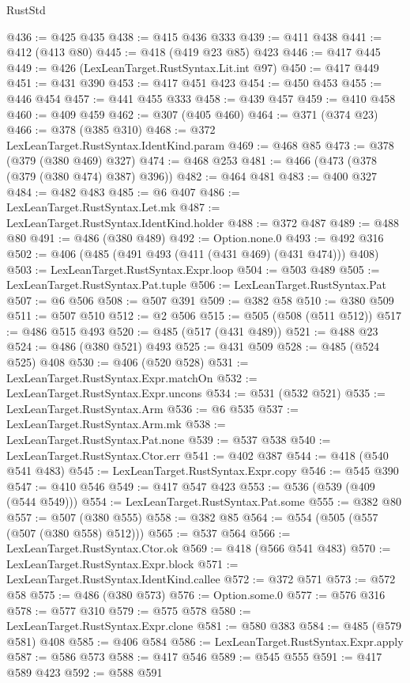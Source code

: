 \begin{lexlean}{RustStd}
\begin{coremodule}
{\begin{coremodule}
{{{{{{{{{{{@436 := @425 @435
@438 := @415 @436 @333
@439 := @411 @438
@441 := @412 (@413 @80)
@445 := @418 (@419 @23 @85) @423
@446 := @417 @445
@449 := @426 (LexLeanTarget.RustSyntax.Lit.int @97)
@450 := @417 @449
@451 := @431 @390
@453 := @417 @451 @423
@454 := @450 @453
@455 := @446 @454
@457 := @441 @455 @333
@458 := @439 @457
@459 := @410 @458
@460 := @409 @459
@462 := @307 (@405 @460)
@464 := @371 (@374 @23)
@466 := @378 (@385 @310)
@468 := @372 LexLeanTarget.RustSyntax.IdentKind.param
@469 := @468 @85
@473 := @378 (@379 (@380 @469) @327)
@474 := @468 @253
@481 := @466 (@473 (@378 (@379 (@380 @474) @387) @396))
@482 := @464 @481
@483 := @400 @327
@484 := @482 @483
@485 := @6 @407
@486 := LexLeanTarget.RustSyntax.Let.mk
@487 := LexLeanTarget.RustSyntax.IdentKind.holder
@488 := @372 @487
@489 := @488 @80
@491 := @486 (@380 @489)
@492 := Option.none.{0}
@493 := @492 @316
@502 := @406 (@485 (@491 @493 (@411 (@431 @469) (@431 @474))) @408)
@503 := LexLeanTarget.RustSyntax.Expr.loop
@504 := @503 @489
@505 := LexLeanTarget.RustSyntax.Pat.tuple
@506 := LexLeanTarget.RustSyntax.Pat
@507 := @6 @506
@508 := @507 @391
@509 := @382 @58
@510 := @380 @509
@511 := @507 @510
@512 := @2 @506
@515 := @505 (@508 (@511 @512))
@517 := @486 @515 @493
@520 := @485 (@517 (@431 @489))
@521 := @488 @23
@524 := @486 (@380 @521) @493
@525 := @431 @509
@528 := @485 (@524 @525) @408
@530 := @406 (@520 @528)
@531 := LexLeanTarget.RustSyntax.Expr.matchOn
@532 := LexLeanTarget.RustSyntax.Expr.uncons
@534 := @531 (@532 @521)
@535 := LexLeanTarget.RustSyntax.Arm
@536 := @6 @535
@537 := LexLeanTarget.RustSyntax.Arm.mk
@538 := LexLeanTarget.RustSyntax.Pat.none
@539 := @537 @538
@540 := LexLeanTarget.RustSyntax.Ctor.err
@541 := @402 @387
@544 := @418 (@540 @541 @483)
@545 := LexLeanTarget.RustSyntax.Expr.copy
@546 := @545 @390
@547 := @410 @546
@549 := @417 @547 @423
@553 := @536 (@539 (@409 (@544 @549)))
@554 := LexLeanTarget.RustSyntax.Pat.some
@555 := @382 @80
@557 := @507 (@380 @555)
@558 := @382 @85
@564 := @554 (@505 (@557 (@507 (@380 @558) @512)))
@565 := @537 @564
@566 := LexLeanTarget.RustSyntax.Ctor.ok
@569 := @418 (@566 @541 @483)
@570 := LexLeanTarget.RustSyntax.Expr.block
@571 := LexLeanTarget.RustSyntax.IdentKind.callee
@572 := @372 @571
@573 := @572 @58
@575 := @486 (@380 @573)
@576 := Option.some.{0}
@577 := @576 @316
@578 := @577 @310
@579 := @575 @578
@580 := LexLeanTarget.RustSyntax.Expr.clone
@581 := @580 @383
@584 := @485 (@579 @581) @408
@585 := @406 @584
@586 := LexLeanTarget.RustSyntax.Expr.apply
@587 := @586 @573
@588 := @417 @546
@589 := @545 @555
@591 := @417 @589 @423
@592 := @588 @591
}}}}}}}}}}}
\end{coremodule}}
\end{coremodule}
\end{lexlean}
